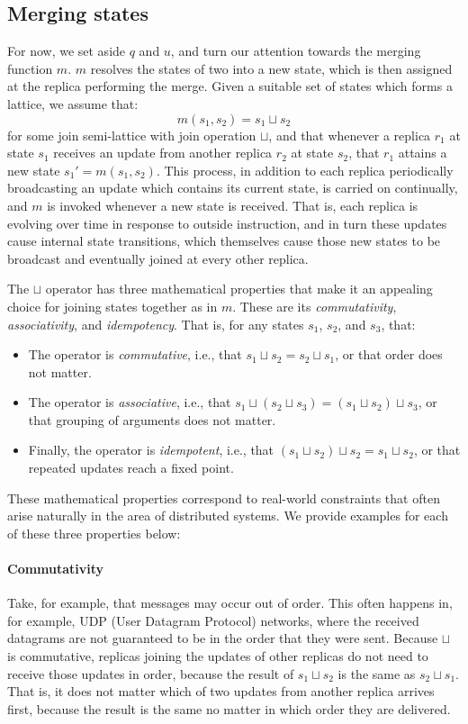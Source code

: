 \subsection{Merging states}

For now, we set aside $q$ and $u$, and turn our attention towards the merging
function $m$. $m$ resolves the states of two \CRDTs into a new state, which is
then assigned at the replica performing the merge. Given a suitable set of
states which forms a lattice, we assume that:
\[
  m(s_1, s_2) = s_1 \sqcup s_2
\]
for some join semi-lattice with join operation $\sqcup$, and that whenever a
\CRDT replica $r_1$ at state $s_1$ receives an update from another replica
$r_2$ at state $s_2$, that $r_1$ attains a new state $s_1' = m(s_1, s_2)$.
This process, in addition to each replica periodically broadcasting an update
which contains its current state, is carried on continually, and $m$ is
invoked whenever a new state is received. That is, each replica is evolving
over time in response to outside instruction, and in turn these updates cause
internal state transitions, which themselves cause those new states to be
broadcast and eventually joined at every other replica.

The $\sqcup$ operator has three mathematical properties that make it an
appealing choice for joining states together as in $m$. These are its
\emph{commutativity}, \emph{associativity}, and \emph{idempotency}. That is, for
any states $s_1$, $s_2$, and $s_3$, that:
\begin{itemize}
  \item The operator is \emph{commutative}, i.e., that $s_1 \sqcup s_2 = s_2
    \sqcup s_1$, or that order does not matter.
  \item The operator is \emph{associative}, i.e., that $s_1 \sqcup (s_2 \sqcup
    s_3) = (s_1 \sqcup s_2) \sqcup s_3$, or that grouping of arguments does not
    matter.
  \item Finally, the operator is \emph{idempotent}, i.e., that $(s_1 \sqcup s_2)
    \sqcup s_2 = s_1 \sqcup s_2$, or that repeated updates reach a fixed point.
\end{itemize}

These mathematical properties correspond to real-world constraints that often
arise naturally in the area of distributed systems. We provide examples for each
of these three properties below:

\paragraph{Commutativity} Take, for example, that messages may occur out of
order. This often happens in, for example, UDP (User Datagram Protocol)
networks, where the received datagrams are not guaranteed to be in the order
that they were sent. Because $\sqcup$ is commutative, replicas joining the
updates of other replicas do not need to receive those updates in order, because
the result of $s_1 \sqcup s_2$ is the same as $s_2 \sqcup s_1$.  That is, it
does not matter which of two updates from another replica arrives first, because
the result is the same no matter in which order they are delivered.

